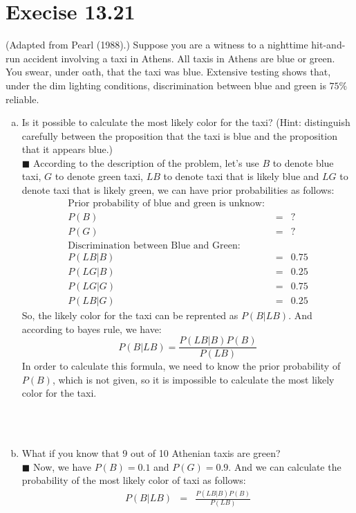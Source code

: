 \documentclass{article}
\newcommand{\solution}[1]{~\\ $\blacksquare$ \sffamily\upshape\selectfont #1
\normalfont ~\\~ }
\begin{document}
\section{Execise 13.21}
(Adapted from Pearl (1988).) Suppose you are a witness to a nighttime
hit-and-run accident involving a taxi in Athens. All taxis in Athens
are blue or green. You swear, under oath, that the taxi was
blue. Extensive testing shows that, under the dim lighting conditions,
discrimination between blue and green is $75\%$ reliable.

\begin{enumerate}[a.]
\item Is it possible to calculate the most likely color for the taxi?
  (Hint: distinguish carefully between the proposition that the taxi is
  blue and the proposition that it appears blue.)
  \solution{According to the description of the problem, let's use $B$
    to denote blue taxi, $G$ to denote green taxi, $LB$ to denote taxi
    that is likely blue and $LG$ to denote taxi that is likely green,
    we can have prior probabilities as follows: \\ 
    \begin{eqnarray*}
      \mbox{Prior probability of blue and green is unknow: } \\
      P(B) & = & ? \\
      P(G) & = & ? \\
      \mbox{Discrimination between Blue and Green: } \\
      P(LB|B) & = & 0.75 \\ 
      P(LG|B) & = & 0.25 \\
      P(LG|G) & = & 0.75 \\
      P(LB|G) & = & 0.25
    \end{eqnarray*}
    So, the likely color for the taxi can be reprented as $P(B|LB)$. 
    And according to bayes rule, we have: \\ 
    \[ P(B|LB)=\frac{P(LB|B)P(B)}{P(LB)} \]
    In order to calculate this formula, we need to know the prior
    probability of $P(B)$, which is not given, so it is impossible to
    calculate the most likely color for the taxi. 
  }
\item What if you know that 9 out of 10 Athenian taxis are green?
  \solution{Now, we have $P(B)=0.1$ and $P(G)=0.9$. And we can
    calculate the probability of the most likely color of taxi as
    follows: \\ 
    \begin{eqnarray*}
      P(B|LB) & = & \frac{P(LB|B)P(B)}{P(LB)} \\

\end{eqnarray*}}
\end{enumerate}
\end{document}
